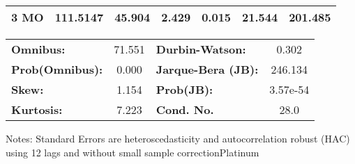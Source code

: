 \begin{center}
\begin{tabular}{lcccccc}
\textbf{3 MO}    &     111.5147  &       45.904     &     2.429  &         0.015        &       21.544    &      201.485     \\
\bottomrule
\end{tabular}
\begin{tabular}{lclc}
\textbf{Omnibus:}       & 71.551 & \textbf{  Durbin-Watson:     } &    0.302  \\
\textbf{Prob(Omnibus):} &  0.000 & \textbf{  Jarque-Bera (JB):  } &  246.134  \\
\textbf{Skew:}          &  1.154 & \textbf{  Prob(JB):          } & 3.57e-54  \\
\textbf{Kurtosis:}      &  7.223 & \textbf{  Cond. No.          } &     28.0  \\
\bottomrule
\end{tabular}
\end{center}

Notes: \newline
 [1] Standard Errors are heteroscedasticity and autocorrelation robust (HAC) using 12 lags and without small sample correctionPlatinum